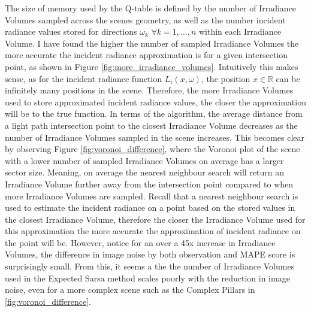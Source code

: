 \documentclass[../dissertation.tex]{subfiles}
\begin{document}
The size of memory used by the Q-table is defined by the number of Irradiance Volumes sampled across the scenes geometry, as well as the number incident radiance values stored for directions $\omega_k$ $\forall k = 1,...,n$  within each Irradiance Volume. I have found the higher the number of sampled Irradiance Volumes the more accurate the incident radiance approximation is for a given intersection point, as shown in Figure \ref{fig:more_irradiance_volumes}.  Intuitively this makes sense, as for the incident radiance function $L_i(x, \omega)$, the position $x \in \mathbb{R}$ can be infinitely many positions  in the scene. Therefore, the more Irradiance Volumes used to store approximated incident radiance values, the closer the approximation will be to the true function. In terms of the algorithm, the average distance from a light path intersection point to the closest Irradiance Volume decreases as the number of Irradiance Volumes sampled in the scene increases. This becomes clear by observing Figure \ref{fig:voronoi_difference}, where the Voronoi plot of the scene with a lower number of sampled Irradiance Volumes on average has a larger sector size. Meaning, on average the nearest neighbour search will return an Irradiance Volume further away from the intersection point compared to when more Irradiance Volumes are sampled. Recall that a nearest neighbour search is used to estimate the incident radiance on a point based on the stored values in the closest Irradiance Volume, therefore the closer the Irradiance Volume used for this approximation the more accurate the approximation of incident radiance on the point will be. However, notice for an over a 45x increase in Irradiance Volumes, the difference in image noise by both observation and MAPE score is surprisingly small. From this, it seems a the the number of Irradiance Volumes used in the Expected Sarsa method scales poorly with the reduction in image noise, even for a more complex scene such as the Complex Pillars in \ref{fig:voronoi_difference}.\\
\end{document}
